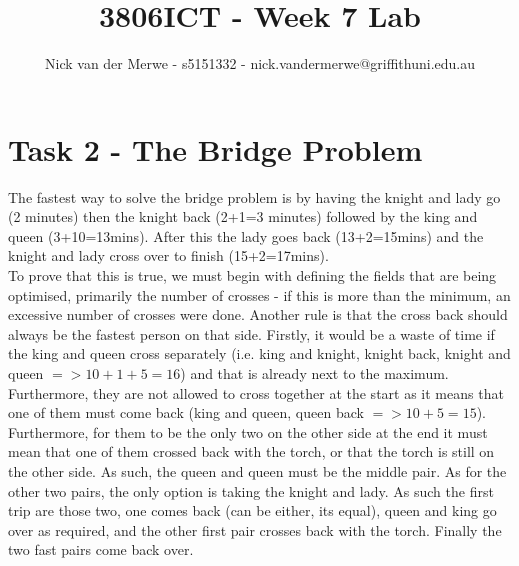 \documentclass{article}
\title{3806ICT - Week 7 Lab}
\author{Nick van der Merwe - s5151332 - nick.vandermerwe@griffithuni.edu.au}
\newcommand\tab[1][1cm]{\hspace*{#1}}
\begin{document}
\maketitle

\section*{Task 2 - The Bridge Problem}
The fastest way to solve the bridge problem is by 
having the knight and lady go (2 minutes) then the knight back
(2+1=3 minutes) followed by the king and queen (3+10=13mins). 
After this the lady goes back (13+2=15mins) and the knight
and lady cross over to finish (15+2=17mins).
\\
\tab To prove that this is true, we must begin with defining the fields that are
being optimised, primarily the number of crosses - if this is more than the minimum, an
excessive number of crosses were done. Another rule is that the cross back
should always be the fastest person on that side. Firstly, it would be a waste
of time if the king and queen cross separately (i.e. king and knight, knight
back, knight and queen $=> 10+1+5=16$) and that is already next to the maximum.
Furthermore, they are not allowed to cross together at the start as it means
that one of them must come back (king and queen, queen back $=>10+5=15$).
Furthermore, for them to be the only two on the other side at the end it must
mean that one of them crossed back with the torch, or that the torch is still on
the other side. As such, the queen and queen must be the middle pair. As for the
other two pairs, the only option is taking the knight and lady. As such the
first trip are those two, one comes back (can be either, its equal), queen and
king go over as required, and the other first pair crosses back with the torch.
Finally the two fast pairs come back over.
\newpage
\end{document}
